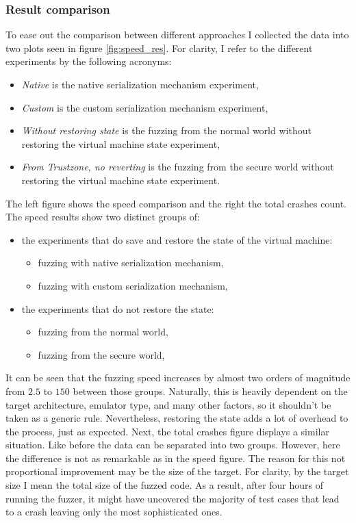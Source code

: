 \subsubsection{Result comparison}
To ease out the comparison between different approaches I collected the data into two plots seen in figure \ref{fig:speed_res}. 
For clarity, I refer to the different experiments by the following acronyms:
\begin{itemize}
    \item \textit{Native} is the native serialization mechanism experiment,
    \item \textit{Custom} is the custom serialization mechanism experiment,
    \item \textit{Without restoring state} is the fuzzing from the normal world without restoring the virtual machine state experiment,
    \item \textit{From Trustzone, no reverting} is the fuzzing from the secure world without restoring the virtual machine state experiment.
\end{itemize}
The left figure shows the speed comparison and the right the total crashes count. The speed results show two distinct groups of:
\begin{itemize}
    \item the experiments that do save and restore the state of the virtual machine:
    \begin{itemize}
        \item fuzzing with native serialization mechanism,
        \item fuzzing with custom serialization mechanism,
    \end{itemize}
    \item the experiments that do not restore the state:
    \begin{itemize}
        \item fuzzing from the normal world,
        \item fuzzing from the secure world,
    \end{itemize}
\end{itemize}
It can be seen that the fuzzing speed increases by almost two orders of magnitude from $2.5$ to $150$ between those groups. Naturally, this is heavily dependent on the target architecture, emulator type, and many other factors, so it shouldn't be taken as a generic rule. Nevertheless, restoring the state adds a lot of overhead to the process, just as expected. Next, the total crashes figure displays a similar situation. Like before the data can be separated into two groups. However, here the difference is not as remarkable as in the speed figure. The reason for this not proportional improvement may be the size of the target. For clarity, by the target size I mean the total size of the fuzzed code. As a result, after four hours of running the fuzzer, it might have uncovered the majority of test cases that lead to a crash leaving only the most sophisticated ones.

